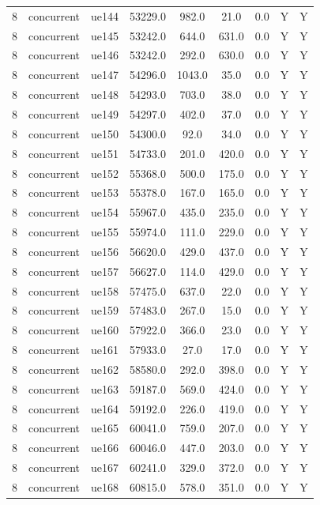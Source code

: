 \begin{table}[ht]
\begin{tabular}{|c|c|c|c|c|c|c|c|c|}
8 & concurrent & ue144 & 53229.0 & 982.0 & 21.0 & 0.0 & Y & Y \\
8 & concurrent & ue145 & 53242.0 & 644.0 & 631.0 & 0.0 & Y & Y \\
8 & concurrent & ue146 & 53242.0 & 292.0 & 630.0 & 0.0 & Y & Y \\
8 & concurrent & ue147 & 54296.0 & 1043.0 & 35.0 & 0.0 & Y & Y \\
8 & concurrent & ue148 & 54293.0 & 703.0 & 38.0 & 0.0 & Y & Y \\
8 & concurrent & ue149 & 54297.0 & 402.0 & 37.0 & 0.0 & Y & Y \\
8 & concurrent & ue150 & 54300.0 & 92.0 & 34.0 & 0.0 & Y & Y \\
8 & concurrent & ue151 & 54733.0 & 201.0 & 420.0 & 0.0 & Y & Y \\
8 & concurrent & ue152 & 55368.0 & 500.0 & 175.0 & 0.0 & Y & Y \\
8 & concurrent & ue153 & 55378.0 & 167.0 & 165.0 & 0.0 & Y & Y \\
8 & concurrent & ue154 & 55967.0 & 435.0 & 235.0 & 0.0 & Y & Y \\
8 & concurrent & ue155 & 55974.0 & 111.0 & 229.0 & 0.0 & Y & Y \\
8 & concurrent & ue156 & 56620.0 & 429.0 & 437.0 & 0.0 & Y & Y \\
8 & concurrent & ue157 & 56627.0 & 114.0 & 429.0 & 0.0 & Y & Y \\
8 & concurrent & ue158 & 57475.0 & 637.0 & 22.0 & 0.0 & Y & Y \\
8 & concurrent & ue159 & 57483.0 & 267.0 & 15.0 & 0.0 & Y & Y \\
8 & concurrent & ue160 & 57922.0 & 366.0 & 23.0 & 0.0 & Y & Y \\
8 & concurrent & ue161 & 57933.0 & 27.0 & 17.0 & 0.0 & Y & Y \\
8 & concurrent & ue162 & 58580.0 & 292.0 & 398.0 & 0.0 & Y & Y \\
8 & concurrent & ue163 & 59187.0 & 569.0 & 424.0 & 0.0 & Y & Y \\
8 & concurrent & ue164 & 59192.0 & 226.0 & 419.0 & 0.0 & Y & Y \\
8 & concurrent & ue165 & 60041.0 & 759.0 & 207.0 & 0.0 & Y & Y \\
8 & concurrent & ue166 & 60046.0 & 447.0 & 203.0 & 0.0 & Y & Y \\
8 & concurrent & ue167 & 60241.0 & 329.0 & 372.0 & 0.0 & Y & Y \\
8 & concurrent & ue168 & 60815.0 & 578.0 & 351.0 & 0.0 & Y & Y \\

\end{tabular}
\end{table}
